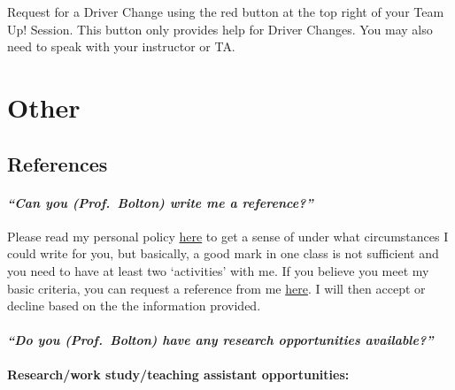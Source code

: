 \documentclass[
  openany]{book}
\begin{document}
Request for a Driver Change using the red button at the top right of your Team Up! Session. This button only provides help for Driver Changes. You may also need to speak with your instructor or TA.

\hypertarget{other}{%
\section{Other}\label{other}}

\hypertarget{references-2}{%
\subsection{References}\label{references-2}}

\hypertarget{can-you-prof.-bolton-write-me-a-reference}{%
\paragraph{\texorpdfstring{\emph{``Can you (Prof.~Bolton) write me a reference?''}}{``Can you (Prof.~Bolton) write me a reference?''}}\label{can-you-prof.-bolton-write-me-a-reference}}

Please read my personal policy \href{https://www.lizabolton.com/references.html}{here} to get a sense of under what circumstances I could write for you, but basically, a good mark in one class is not sufficient and you need to have at least two `activities' with me. {If you believe you meet my basic criteria, you can request a reference from me \href{https://forms.office.com/r/XHqjGXjCru}{here}.} I will then accept or decline based on the the information provided.

\hypertarget{do-you-prof.-bolton-have-any-research-opportunities-available}{%
\paragraph{\texorpdfstring{\emph{``Do you (Prof.~Bolton) have any research opportunities available?''}}{``Do you (Prof.~Bolton) have any research opportunities available?''}}\label{do-you-prof.-bolton-have-any-research-opportunities-available}}

\textbf{Research/work study/teaching assistant opportunities:}
\end{document}
